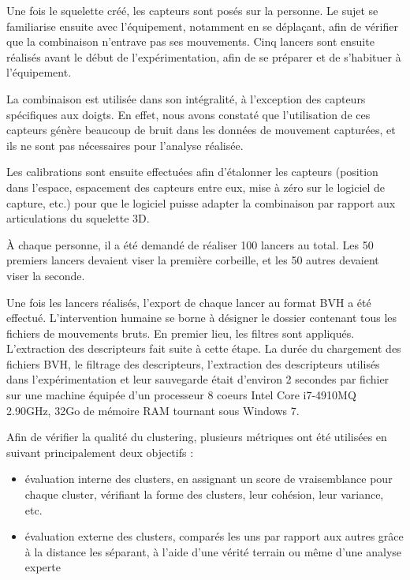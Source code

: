 Une fois le squelette créé, les capteurs sont posés sur la personne. Le sujet se familiarise ensuite avec l'équipement, notamment en se déplaçant, afin de vérifier que la combinaison n'entrave pas ses mouvements. Cinq lancers sont ensuite réalisés avant le début de l'expérimentation, afin de se préparer et de s'habituer à l'équipement.

La combinaison est utilisée dans son intégralité, à l'exception des capteurs spécifiques aux doigts. En effet, nous avons constaté que l'utilisation de ces capteurs génère beaucoup de bruit dans les données de mouvement capturées, et ils ne sont pas nécessaires pour l'analyse réalisée.

Les calibrations sont ensuite effectuées afin d'étalonner les capteurs (position dans l'espace, espacement des capteurs entre eux, mise à zéro sur le logiciel de capture, etc.) pour que le logiciel puisse adapter la combinaison par rapport aux articulations du squelette 3D.

À chaque personne, il a été demandé de réaliser 100 lancers au total. Les 50 premiers lancers devaient viser la première corbeille, et les 50 autres devaient viser la seconde.

Une fois les lancers réalisés, l'export de chaque lancer au format BVH a été effectué. L'intervention humaine se borne à désigner le dossier contenant tous les fichiers de mouvements bruts. En premier lieu, les filtres sont appliqués. L'extraction des descripteurs fait suite à cette étape. La durée du chargement des fichiers BVH, le filtrage des descripteurs, l'extraction des descripteurs utilisés dans l'expérimentation et leur sauvegarde était d'environ 2 secondes par fichier sur une machine équipée d'un processeur 8 coeurs Intel Core i7-4910MQ 2.90GHz, 32Go de mémoire RAM tournant sous Windows 7.

Afin de vérifier la qualité du clustering, plusieurs métriques ont été utilisées en suivant principalement deux objectifs :
\begin{itemize}[label=$-$]
	\item évaluation interne des clusters, en assignant un score de vraisemblance pour chaque cluster, vérifiant la forme des clusters, leur cohésion, leur variance, etc.
	\item  évaluation externe des clusters, comparés les uns par rapport aux autres grâce à la distance les séparant, à l'aide d'une vérité terrain ou même d'une analyse experte \parencite{Jain1988ACD, Maulik2002Peo}
\end{itemize}

